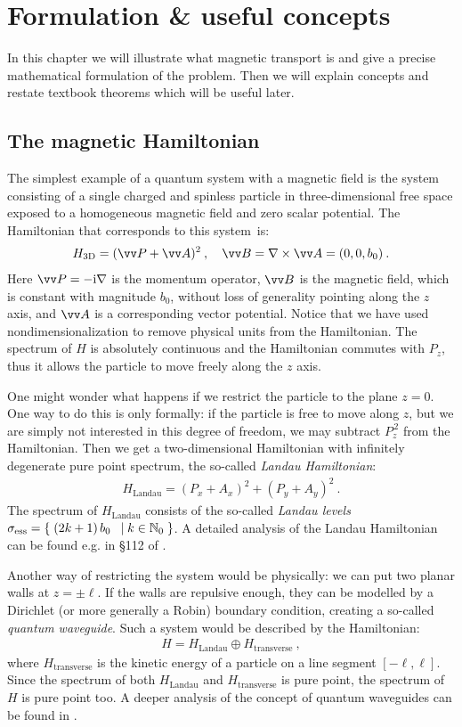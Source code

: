\chapter{Formulation \& useful concepts}
In this chapter we will illustrate what magnetic transport is and give a precise mathematical formulation of the problem. Then we will explain concepts and restate textbook theorems which will be useful later.

\section{The magnetic Hamiltonian}
The simplest example of a quantum system with a magnetic field is the system consisting of a single charged and spinless particle in three-dimensional free space exposed to a homogeneous magnetic field and zero scalar potential. The Hamiltonian that corresponds to this system~is:
\begin{align*}
    H_\mathrm{3D} = (\vv P + \vv A)^2 \: , \quad
    \vv B = \nabla \times \vv A = (0, 0, b_0) \: .
\end{align*}
Here $\vv P = -\i \nabla$ is the momentum operator, $\vv B$ is the magnetic field, which is constant with magnitude $b_0$, without loss of generality pointing along the $z$ axis, and $\vv A$ is a corresponding vector potential. Notice that we have used nondimensionalization to remove physical units from the Hamiltonian. The spectrum of $H$ is absolutely continuous and the Hamiltonian commutes with $P_z$, thus it allows the particle to move freely along the $z$ axis.

One might wonder what happens if we restrict the particle to the plane $z=0$. One way to do this is only formally: if the particle is free to move along $z$, but we are simply not interested in this degree of freedom, we may subtract $P_z^{\,2}$ from the Hamiltonian. Then we get a two-dimensional Hamiltonian with infinitely degenerate pure point spectrum, the so-called \textit{Landau Hamiltonian}:
\begin{align*}
    H_\mathrm{Landau} = (P_x + A_x)^2 + (P_y + A_y)^2 \: .
\end{align*}
The spectrum of $H_\mathrm{Landau}$ consists of the so-called \textit{Landau levels} $\sigma_{\mathrm{ess}} = \{ \; {(2k + 1) \, b_0} $ $\;|\; k \in \mathbb{N}_0 \; \}$. A detailed analysis of the Landau Hamiltonian can be found e.g. in §112 of \cite{LandauLifshitz3}.

Another way of restricting the system would be physically: we can put two planar walls at $z=\pm\ell$. If the walls are repulsive enough, they can be modelled by a Dirichlet (or more generally a Robin) boundary condition, creating a so-called \textit{quantum waveguide}. Such a system would be described by the Hamiltonian:
\begin{align*}
    H = H_\mathrm{Landau} \oplus H_\mathrm{transverse} \: ,
\end{align*}
where $H_\mathrm{transverse}$ is the kinetic energy of a particle on a line segment $[ -\ell, \ell ]$. Since the spectrum of both $H_\mathrm{Landau}$ and $H_\mathrm{transverse}$ is pure point, the spectrum of $H$ is pure point too. A deeper analysis of the concept of quantum waveguides can be found in \cite{ExnerKovarik2015}.

